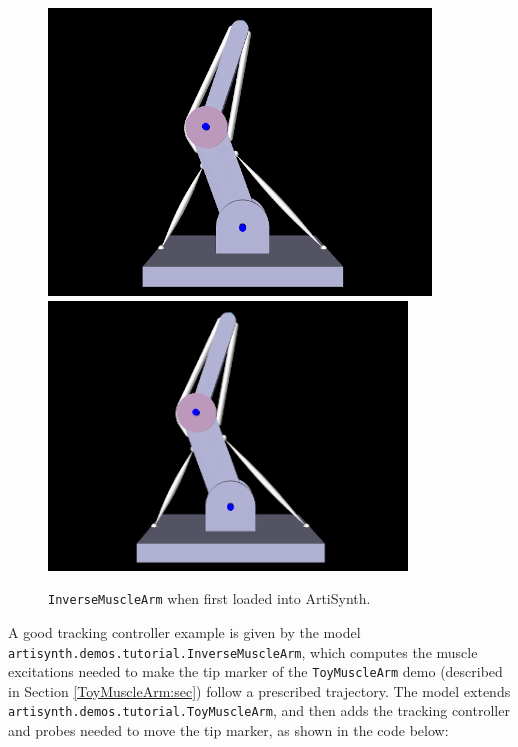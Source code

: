 \begin{figure}[ht]
\begin{center}
   \iflatexml
      \includegraphics[]{images/InverseMuscleArm}
   \else
      \includegraphics[width=3.75in]{images/InverseMuscleArm}
   \fi
\end{center}
\caption{{\tt InverseMuscleArm} when first loaded into ArtiSynth.}
\label{InverseMuscleArm:fig}
\end{figure}

A good tracking controller example is given by the model {\tt
artisynth.demos.tutorial.InverseMuscleArm}, which computes the muscle
excitations needed to make the tip marker of the {\tt ToyMuscleArm} demo
(described in Section \ref{ToyMuscleArm:sec}) follow a prescribed trajectory.
The model extends {\tt artisynth.demos.tutorial.ToyMuscleArm}, and then adds
the tracking controller and probes needed to move the tip marker,
as shown in the code below:
%
\lstset{numbers=left}
\iflatexml

\else

\fi
\lstset{numbers=none}
%

